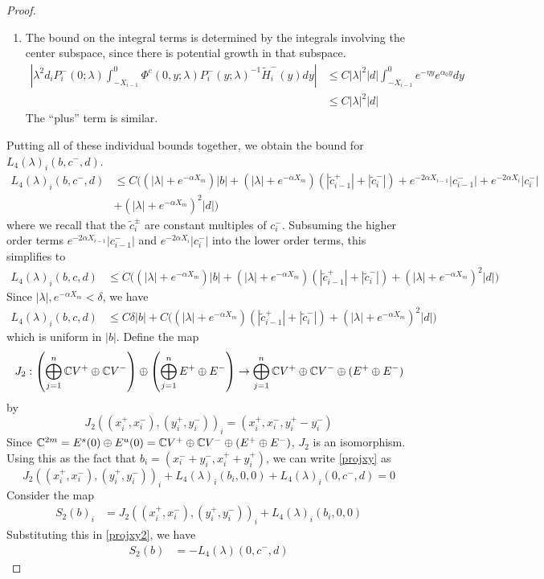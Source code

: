 \documentclass[thesis.tex]{subfiles}
\begin{document}
\begin{lemma}
\begin{proof}
\begin{enumerate}
\item The bound on the integral terms is determined by the integrals involving the center subspace, since there is potential growth in that subspace.
\begin{align*}
\left| \lambda^2 d_i P_i^-(0; \lambda) \int_{-X_{i-1}}^0 \Phi^c(0, y; \lambda) P_i^-(y; \lambda)^{-1} \tilde{H}_i^-(y) dy \right| &\leq C |\lambda|^2 |d| \int_{-X_{i-1}}^0 e^{-\eta y} e^{\alpha_0 y} dy \\
&\leq C |\lambda|^2 |d|
\end{align*}
The ``plus'' term is similar.
\end{enumerate}

Putting all of these individual bounds together, we obtain the bound for $L_4(\lambda)_i(b, c^-, d)$.
\begin{align*}
L_4(\lambda)_i(b, c^-, d) &\leq 
C\Big( (|\lambda| + e^{-\alpha X_m})|b| 
+ (|\lambda| + e^{-\alpha X_m})(|\tilde{c}_{i-1}^+| + |\tilde{c}_i^-|) + e^{-2\alpha X_{i-1}} |c_{i-1}^-| + e^{-2\alpha X_i} |c_i^-| \\
&+ (|\lambda| + e^{-\alpha X_m})^2 |d| \Big) 
\end{align*}
where we recall that the $\tilde{c}_i^\pm$ are constant multiples of $c_i^-$. Subsuming the higher order terms $e^{-2\alpha X_{i-1}} |c_{i-1}^-|$ and $e^{-2\alpha X_i} |c_i^-|$ into the lower order terms, this simplifies to
\begin{align*}
L_4(\lambda)_i(b, c, d) &\leq 
C\Big( (|\lambda| + e^{-\alpha X_m})|b|  
+ (|\lambda| + e^{-\alpha X_m})(|\tilde{c}_{i-1}^+| + |\tilde{c}_i^-|) + (|\lambda| + e^{-\alpha X_m})^2 |d|  \Big) 
\end{align*}
Since $|\lambda|, e^{-\alpha X_m} < \delta$, we have
\begin{align*}
L_4(\lambda)_i(b, c, d) &\leq C \delta |b| 
+ C \Big( (|\lambda| + e^{-\alpha X_m})(|\tilde{c}_{i-1}^+| + |\tilde{c}_i^-|)+ (|\lambda| + e^{-\alpha X_m})^2 |d| \Big) 
\end{align*}
which is uniform in $|b|$. Define the map
\[
J_2: \left( \bigoplus_{j=1}^n {\mathbb C} V^+ \oplus {\mathbb C} V^- \right) \oplus
\left( \bigoplus_{j=1}^n E^+ \oplus E^- \right) 
\rightarrow \bigoplus_{j=1}^n {\mathbb C} V^+ \oplus {\mathbb C} V^- \oplus (E^+ \oplus E^-)
\]
by 
\[
J_2( (x_i^+, x_i^-),(y_i^+, y_i^-))_i = ( x_i^+, x_i^-, y_i^+ - y_i^- )
\]
Since ${\mathbb C}^{2m} = E^s(0) \oplus E^u(0) = {\mathbb C} V^+ \oplus {\mathbb C} V^- \oplus (E^+ \oplus E^-)$, $J_2$ is an isomorphism. Using this as the fact that $b_i = (x_i^- + y_i^-, x_i^+ + y_i^+)$, we can write \eqref{projxy} as
\begin{equation}\label{projxy2}
J_2( (x_i^+, x_i^-),(y_i^+, y_i^-))_i 
+ L_4(\lambda)_i(b_i, 0, 0) + L_4(\lambda)_i(0, c^-, d) = 0
\end{equation}
Consider the map
\begin{align*}
S_2(b)_i &= J_2( (x_i^+, x_i^-),(y_i^+, y_i^-))_i 
+ L_4(\lambda)_i(b_i, 0, 0) 
\end{align*}
Substituting this in \eqref{projxy2}, we have
\begin{align*}
S_2(b) &= -L_4(\lambda)(0, c^-, d)
\end{align*}


\end{proof}
\end{lemma}
\end{document}
